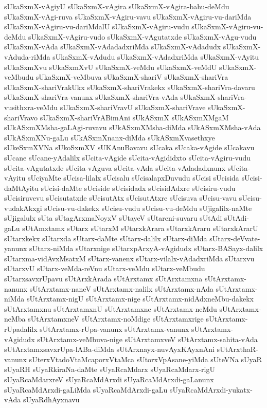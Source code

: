 {sUkaSxmX-vAgiyU
sUkaSxmX-vAgira
sUkaSxmX-vAgira-bahu-deMdu
sUkaSxmX-vAgi-ruva
sUkaSxmX-vAgiru-vavu
sUkaSxmX-vAgiru-vu-dariMda
sUkaSxmX-vAgiru-vu-dariMdalU
sUkaSxmX-vAgiru-vudu
sUkaSxmX-vAgiru-vu-deMdu
sUkaSxmX-vAgiru-vudo
sUkaSxmX-vAgutatxde
sUkaSxmX-vAgu-vudu
sUkaSxmX-vAda
sUkaSxmX-vAdadadxriMda
sUkaSxmX-vAdadudx
sUkaSxmX-vAduda-riMda
sUkaSxmX-vAdudu
sUkaSxmX-vAdadxriMda
sUkaSxmX-vAyitu
sUkaSxmXvu
sUkaSxmXvU
sUkaSxmX-veMdu
sUkaSxmX-veMdU
sUkaSxmX-veMbudu
sUkaSxmX-veMbuva
sUkaSxmX-shariV
sUkaSxmX-shariVra
sUkaSxmX-shariVrakUkx
sUkaSxmX-shariVrakekx
sUkaSxmX-shariVra-davaru
sUkaSxmX-shariVra-vanunx
sUkaSxmX-shariVra-vAda
sUkaSxmX-shariVra-vusithxra-veMdu
sUkaSxmX-shariVravU
sUkaSxmX-shariVrave
sUkaSxmX-shariVravo
sUkaSxmX-shariVrABimAni
sUkASxmX
sUkASxmXMgaM
sUkASxmXMsha-gaLAgi-ruvavu
sUkASxmXMsha-diMda
sUkASxmXMsha-vAda
sUkASxmXNu-gaLu
sUkASxmXnanx-diMda
sUkASxmXvasethxye
sUkeSxmXVNa
sUkoSxmXV
sUKAnuBavavu
sUcaka
sUcaka-vAgide
sUcakavu
sUcane
sUcane-yAdalilx
sUcita-vAgide
sUcita-vAgididxto
sUcita-vAgiru-vudu
sUcita-vAgutatxde
sUcita-vAguva
sUcita-vAda
sUcita-vAdadadxnunx
sUcita-vAyitu
sUciyaMte
sUcisa-lilalx
sUcisalu
sUcisalapxDuvudu
sUcisi
sUcisida
sUcisi-daMtAyitu
sUcisi-daMte
sUciside
sUcisidadx
sUcisidAdxre
sUcisiru-vudu
sUcisiruvevu
sUcisutatxde
sUcisutAtx
sUcisutAtxre
sUcisuva
sUcisu-vavu
sUcisu-vudakAkxgi
sUcisu-vu-dakekx
sUcisu-vudu
sUcisu-vu-deMdu
sUjigalilx-naMte
sUjigalulx
sUta
sUtagArxmaNoyxV
sUtayeV
sUtareni-suvaru
sUtAdi
sUtAdi-gaLu
sUtAmxtamx
sUtarx
sUtarxM
sUtarxkArara
sUtarxkAraru
sUtarxkArarU
sUtarxkekx
sUtarxda
sUtarx-daMte
sUtarx-dalilx
sUtarx-diMda
sUtarx-deVvate-yanunx
sUtarx-niMda
sUtarxnige
sUtarxpArxyA-vAgidudx
sUtarx-BASayx-dalilx
sUtarxma-vidAvxMsatxM
sUtarx-vanenx
sUtarx-vilalx-vAdadxriMda
sUtarxvu
sUtarxvU
sUtarx-veMda-reVnu
sUtarx-veMdu
sUtarx-veMbudu
sUtarxsavxrUpavu
sUtArxkArada
sUtArxtamx
sUtArxtamxna
sUtArxtamx-nanunx
sUtArxtamx-naneV
sUtArxtamx-nalilx
sUtArxtamx-nAda
sUtArxtamx-niMda
sUtArxtamx-nigU
sUtArxtamx-nige
sUtArxtamx-nidAdxneMbu-dakekx
sUtArxtamxnu
sUtArxtamxnU
sUtArxtamxne
sUtArxtamx-neMdu
sUtArxtamx-neMba
sUtArxtamxneV
sUtArxtamx-noMdige
sUtArxtamxrige
sUtArxtamx-rUpadalilx
sUtArxtamx-rUpa-vanunx
sUtArxtamx-vanunx
sUtArxtamx-vAgidudx
sUtArxtamx-veMbuva-nige
sUtArxtamxveV
sUtArxtamx-sahita-vAda
sUtArxtamxsavxrUpa-lABa-diMda
sUtArxnayx-nuvAyxKAyxnAni
sUtArxthaR-vanunx
sUterxVtadoVtaMcaporxVtaMca
sUtorxVpAsane-yiMda
sUteVNa
sUyaR
sUyaRH
sUyaRkiraNa-daMte
sUyaRcaMdarx
sUyaRcaMdarx-rigU
sUyaRcaMdarxreV
sUyaRcaMdArxdi
sUyaRcaMdArxdi-gaLanunx
sUyaRcaMdArxdi-gaLiMda
sUyaRcaMdArxdi-gaLu
sUyaRcaMdArxdi-yukatx-vAda
sUyaRdhAyxnavu
}
